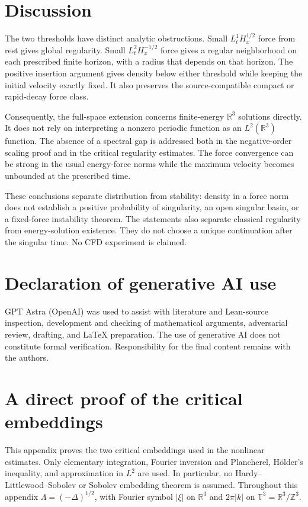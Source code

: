 \documentclass[11pt,a4paper]{article}
\theoremstyle{definition}\newtheorem{definition}[theorem]{Definition}
\theoremstyle{remark}\newtheorem{remark}[theorem]{Remark}
\newcommand{\R}{\mathbb R}\newcommand{\TT}{\mathbb T^3}
\begin{document}
\section{Discussion}
The two thresholds have distinct analytic obstructions. Small $L^1_tH^{1/2}_x$ force from rest gives global regularity. Small $L^2_tH^{-1/2}_x$ force gives a regular neighborhood on each prescribed finite horizon, with a radius that depends on that horizon. The positive insertion argument gives density below either threshold while keeping the initial velocity exactly fixed. It also preserves the source-compatible compact or rapid-decay force class.

Consequently, the full-space extension concerns finite-energy $\R^3$ solutions directly. It does not rely on interpreting a nonzero periodic function as an $L^2(\R^3)$ function. The absence of a spectral gap is addressed both in the negative-order scaling proof and in the critical regularity estimates. The force convergence can be strong in the usual energy-force norms while the maximum velocity becomes unbounded at the prescribed time.

These conclusions separate distribution from stability: density in a force norm does not establish a positive probability of singularity, an open singular basin, or a fixed-force instability theorem. The statements also separate classical regularity from energy-solution existence. They do not choose a unique continuation after the singular time. No CFD experiment is claimed.

\section*{Declaration of generative AI use}
GPT Astra (OpenAI) was used to assist with literature and Lean-source inspection, development and checking of mathematical arguments, adversarial review, drafting, and LaTeX preparation. The use of generative AI does not constitute formal verification. Responsibility for the final content remains with the authors.

\appendix

\section{A direct proof of the critical embeddings}\label{sec:critical-appendix}
This appendix proves the two critical embeddings used in the nonlinear
estimates.  Only elementary integration, Fourier inversion and Plancherel,
H\"older's inequality, and approximation in $L^2$ are used.  In particular,
no Hardy--Littlewood--Sobolev or Sobolev embedding theorem is assumed.
Throughout this appendix $\Lambda=(-\Delta)^{1/2}$, with Fourier symbol
$|\xi|$ on $\R^3$ and $2\pi|k|$ on $\TT=\R^3/\mathbb Z^3$.
\end{document}
